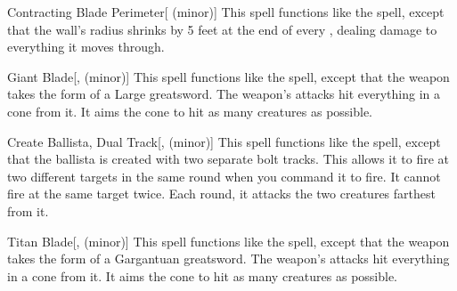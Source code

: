 \lowercase{\hypertarget{spell:Contracting Blade Perimeter}{}}\label{spell:Contracting Blade Perimeter}
\begin{apability}[\nth{3}]{\hypertarget{spell:Contracting Blade Perimeter}{Contracting Blade Perimeter}}[ (minor)]
This spell functions like the  spell, except that the wall's radius shrinks by 5 feet at the end of every , dealing damage to everything it moves through.
\end{apability}
\vspace{0.25em}



\lowercase{\hypertarget{spell:Giant Blade}{}}\label{spell:Giant Blade}
\begin{apability}[\nth{3}]{\hypertarget{spell:Giant Blade}{Giant Blade}}[,  (minor)]
This spell functions like the  spell, except that the weapon takes the form of a Large greatsword.
The weapon's attacks hit everything in a \areasmall cone from it.
It aims the cone to hit as many creatures as possible.
\end{apability}
\vspace{0.25em}



\lowercase{\hypertarget{spell:Create Ballista, Dual Track}{}}\label{spell:Create Ballista, Dual Track}
\begin{apability}[\nth{4}]{\hypertarget{spell:Create Ballista, Dual Track}{Create Ballista, Dual Track}}[,  (minor)]
This spell functions like the  spell, except that the ballista is created with two separate bolt tracks.
This allows it to fire at two different targets in the same round when you command it to fire.
It cannot fire at the same target twice.
Each round, it attacks the two creatures farthest from it.
\end{apability}
\vspace{0.25em}



\lowercase{\hypertarget{spell:Titan Blade}{}}\label{spell:Titan Blade}
\begin{apability}[\nth{6}]{\hypertarget{spell:Titan Blade}{Titan Blade}}[,  (minor)]
This spell functions like the  spell, except that the weapon takes the form of a Gargantuan greatsword.
The weapon's attacks hit everything in a \areamed cone from it.
It aims the cone to hit as many creatures as possible.
\end{apability}
\vspace{0.25em}



